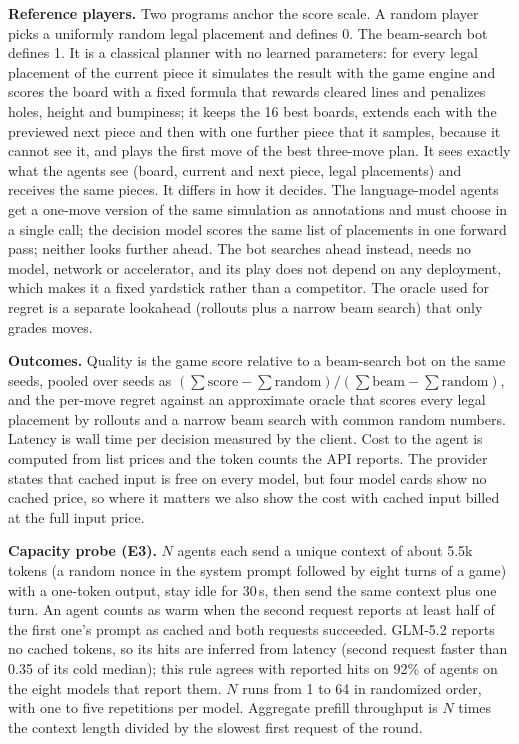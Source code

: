 \documentclass{article}
\begin{document}
\textbf{Reference players.} Two programs anchor the score scale. A random player picks a uniformly random legal placement and defines 0. The beam-search bot defines 1. It is a classical planner with no learned parameters: for every legal placement of the current piece it simulates the result with the game engine and scores the board with a fixed formula that rewards cleared lines and penalizes holes, height and bumpiness; it keeps the 16 best boards, extends each with the previewed next piece and then with one further piece that it samples, because it cannot see it, and plays the first move of the best three-move plan. It sees exactly what the agents see (board, current and next piece, legal placements) and receives the same pieces. It differs in how it decides. The language-model agents get a one-move version of the same simulation as annotations and must choose in a single call; the decision model scores the same list of placements in one forward pass; neither looks further ahead. The bot searches ahead instead, needs no model, network or accelerator, and its play does not depend on any deployment, which makes it a fixed yardstick rather than a competitor. The oracle used for regret is a separate lookahead (rollouts plus a narrow beam search) that only grades moves.

\textbf{Outcomes.} Quality is the game score relative to a beam-search bot on the same seeds, pooled over seeds as $(\sum \text{score} - \sum \text{random}) / (\sum \text{beam} - \sum \text{random})$, and the per-move regret against an approximate oracle that scores every legal placement by rollouts and a narrow beam search with common random numbers. Latency is wall time per decision measured by the client. Cost to the agent is computed from list prices and the token counts the API reports. The provider states that cached input is free on every model, but four model cards show no cached price, so where it matters we also show the cost with cached input billed at the full input price.

\textbf{Capacity probe (E3).} $N$ agents each send a unique context of about 5.5k tokens (a random nonce in the system prompt followed by eight turns of a game) with a one-token output, stay idle for 30\,s, then send the same context plus one turn. An agent counts as warm when the second request reports at least half of the first one's prompt as cached and both requests succeeded. GLM-5.2 reports no cached tokens, so its hits are inferred from latency (second request faster than 0.35 of its cold median); this rule agrees with reported hits on 92\% of agents on the eight models that report them. $N$ runs from 1 to 64 in randomized order, with one to five repetitions per model. Aggregate prefill throughput is $N$ times the context length divided by the slowest first request of the round.
\end{document}

